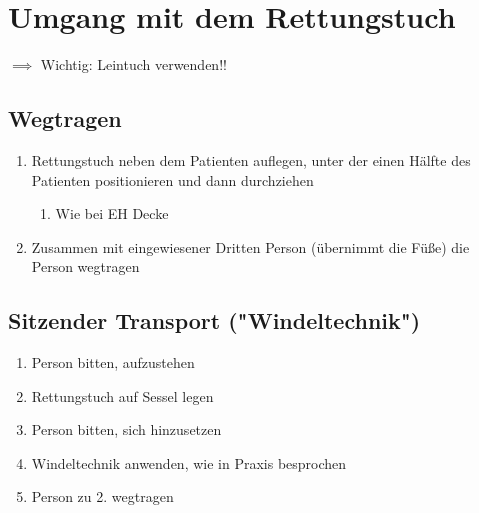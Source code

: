 \chapter{Umgang mit dem Rettungstuch}
$\implies$ Wichtig: Leintuch verwenden!!
\section{Wegtragen}
\begin{enumerate}
    \item Rettungstuch neben dem Patienten auflegen, unter der einen Hälfte des Patienten positionieren und dann durchziehen
          \begin{enumerate}
              \item Wie bei EH Decke
          \end{enumerate}
    \item Zusammen mit eingewiesener Dritten Person (übernimmt die Füße) die Person wegtragen
\end{enumerate}
\section{Sitzender Transport ("Windeltechnik")}
\begin{enumerate}
    \item Person bitten, aufzustehen
    \item Rettungstuch auf Sessel legen
    \item Person bitten, sich hinzusetzen
    \item Windeltechnik anwenden, wie in Praxis besprochen
    \item Person zu 2. wegtragen
\end{enumerate}
